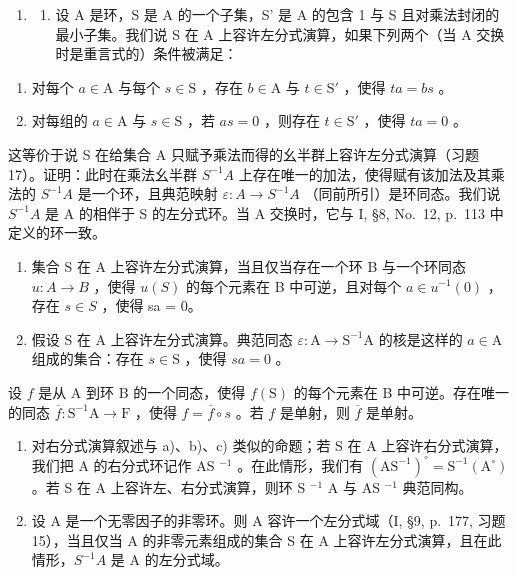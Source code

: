 \begin{enumerate}
\def\labelenumi{\arabic{enumi})}
\setcounter{enumi}{17}
\tightlist
\item
  \begin{enumerate}
  \def\labelenumii{\alph{enumii})}
  \tightlist
  \item
    设 A 是环，S 是 A 的一个子集，S' 是 A 的包含 1 与 S 且对乘法封闭的最小子集。我们说 S 在 A 上容许左分式演算，如果下列两个（当 A 交换时是重言式的）条件被满足：
  \end{enumerate}
\end{enumerate}

\begin{enumerate}
\def\labelenumi{(\roman{enumi})}
\item
  对每个 \(a \in \mathrm{A}\) 与每个 \(s \in \mathrm{S}\) ，存在 \(b \in \mathrm{A}\) 与 \(t \in \mathrm{S}'\) ，使得 \(ta = bs\) 。
\item
  对每组的 \(a \in \mathrm{A}\) 与 \(s \in \mathrm{S}\) ，若 \(as = 0\) ，则存在 \(t \in \mathrm{S}'\) ，使得 \(ta = 0\) 。
\end{enumerate}

这等价于说 S 在给集合 A 只赋予乘法而得的幺半群上容许左分式演算（习题 17）。证明：此时在乘法幺半群 \(S^{-1}A\) 上存在唯一的加法，使得赋有该加法及其乘法的 \(S^{-1}A\) 是一个环，且典范映射 \(\varepsilon: A \to S^{-1}A\) （同前所引）是环同态。我们说 \(S^{-1}A\) 是 A 的相伴于 S 的左分式环。当 A 交换时，它与 I, §8, No.~12, p.~113 中定义的环一致。

\begin{enumerate}
\def\labelenumi{\alph{enumi})}
\setcounter{enumi}{1}
\item
  集合 S 在 A 上容许左分式演算，当且仅当存在一个环 B 与一个环同态 \(u: A \to B\) ，使得 \(u(S)\) 的每个元素在 B 中可逆，且对每个 \(a \in u^{-1}(0)\) ，存在 \(s \in S\) ，使得 sa = 0。
\item
  假设 S 在 A 上容许左分式演算。典范同态 \(\varepsilon : \mathrm{A} \to \mathrm{S}^{-1}\mathrm{A}\) 的核是这样的 \(a \in \mathrm{A}\) 组成的集合：存在 \(s \in \mathrm{S}\) ，使得 \(sa = 0\) 。
\end{enumerate}

设 \(f\) 是从 A 到环 B 的一个同态，使得 \(f(\mathrm{S})\) 的每个元素在 B 中可逆。存在唯一的同态 \(\overline{f} : \mathrm{S}^{-1}\mathrm{A} \to \mathrm{F}\) ，使得 \(f = \overline{f} \circ s\) 。若 \(f\) 是单射，则 \(\overline{f}\) 是单射。

\begin{enumerate}
\def\labelenumi{\alph{enumi})}
\setcounter{enumi}{3}
\item
  对右分式演算叙述与 a)、b)、c) 类似的命题；若 S 在 A 上容许右分式演算，我们把 A 的右分式环记作 AS \(^{-1}\) 。在此情形，我们有 \((\mathrm{AS}^{-1})^{\circ} = \mathrm{S}^{-1}(\mathrm{A}^{\circ})\) 。若 S 在 A 上容许左、右分式演算，则环 S \(^{-1}\) A 与 AS \(^{-1}\) 典范同构。
\item
  设 A 是一个无零因子的非零环。则 A 容许一个左分式域（I, §9, p.~177, 习题 15），当且仅当 A 的非零元素组成的集合 S 在 A 上容许左分式演算，且在此情形，\(S^{-1}A\) 是 A 的左分式域。
\end{enumerate}

